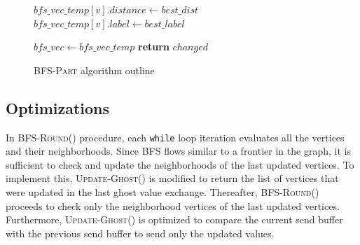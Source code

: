 \documentclass[conference]{IEEEtran}
\newcommand{\bfspart}{\textsc{BFS-Part}\xspace}
\begin{document}
\begin{figure}
\begin{algorithmic}[1]
            \EndIf
            \EndFor
        \State $bfs\_vec\_temp[v].distance \gets best\_dist$
        \State $bfs\_vec\_temp[v].label \gets best\_label$

        \EndFor
        \State $bfs\_vec \gets bfs\_vec\_temp$
    \EndWhile
    \State \textbf{return} $changed$
    \EndProcedure


    \end{algorithmic}  
    \caption{\bfspart algorithm outline}  
    \label{algo:bfs-par-outline}  
\end{figure}

\subsection{Optimizations}
In \textsc{BFS-Round()} procedure, each \verb|while| loop iteration evaluates all the vertices and their neighborhoods. Since BFS flows similar to a frontier in the graph, it is sufficient to check and update the neighborhoods of the last updated vertices. To implement this, \textsc{Update-Ghost()} is modified to return the list of vertices that were updated in the last ghost value exchange. Thereafter, \textsc{BFS-Round()} proceeds to check only the neighborhood vertices of the last updated vertices. Furthermore, \textsc{Update-Ghost()} is optimized to compare the current send buffer with the previous send buffer to send only the updated values.




\end{document}
